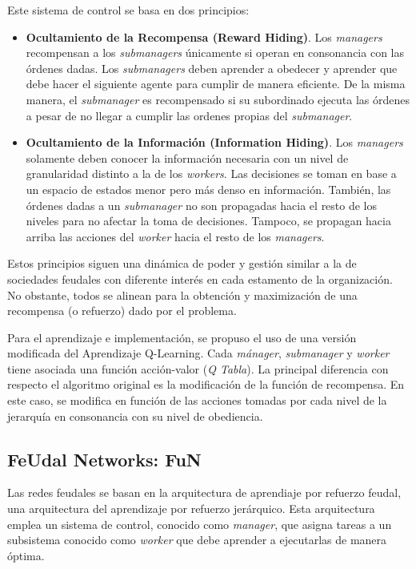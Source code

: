 \documentclass[letterpaper]{article} %
\begin{document}
Este sistema de control se basa en dos principios:
\begin{itemize}
    \item \textbf{Ocultamiento de la Recompensa (Reward Hiding)}. Los \textit{managers} recompensan a los \textit{submanagers} únicamente si operan 
    en consonancia con las órdenes dadas. Los \textit{submanagers} deben aprender a obedecer y aprender que debe hacer el siguiente agente para 
    cumplir de manera eficiente. De la misma manera, el \textit{submanager} es recompensado si su subordinado ejecuta las órdenes a pesar de no llegar a cumplir 
    las ordenes propias del \textit{submanager}.

    \item \textbf{Ocultamiento de la Información (Information Hiding)}. Los \textit{managers} solamente deben conocer la información necesaria 
    con un nivel de granularidad distinto a la de los \textit{workers}. Las decisiones se toman en base a un espacio de estados menor pero más
    denso en información. También, las órdenes dadas a un \textit{submanager} no son propagadas hacia el resto de los niveles para no afectar la toma
    de decisiones. Tampoco, se propagan hacia arriba las acciones del \textit{worker} hacia el resto de los \textit{managers}. 
\end{itemize}

Estos principios siguen una dinámica de poder y gestión similar a la de sociedades feudales con diferente interés en cada estamento de la organización.
No obstante, todos se alinean para la obtención y maximización de una recompensa (o refuerzo) dado por el problema.

Para el aprendizaje e implementación, se propuso el uso de una versión modificada del Aprendizaje Q-Learning. Cada \textit{mánager}, \textit{submanager} y
\textit{worker} tiene asociada una función acción-valor (\textit{Q Tabla}). La principal diferencia con respecto el algoritmo original es la 
modificación de la función de recompensa. En este caso, se modifica en función de las acciones tomadas por cada nivel de la jerarquía en consonancia 
con su nivel de obediencia. 

\subsection{FeUdal Networks: FuN}

Las redes feudales se basan en la arquitectura de aprendiaje por refuerzo feudal, 
una arquitectura del aprendizaje por refuerzo jerárquico. Esta arquitectura emplea un sistema de control, conocido
como \textit{manager}, que asigna tareas a un subsistema conocido como \textit{worker} que debe aprender a ejecutarlas de manera óptima.
\end{document}
